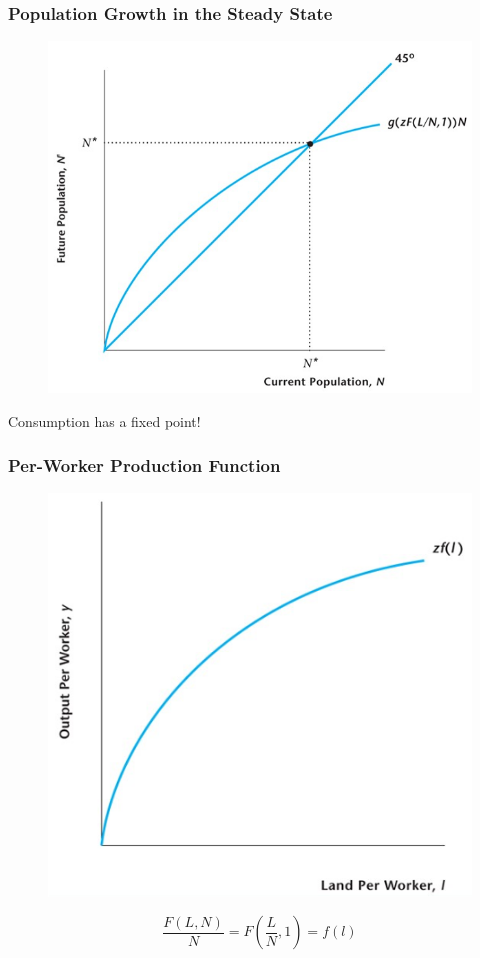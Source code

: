 \documentclass{beamer}
\begin{document}
\begin{frame}
\frametitle[alignment=center]{Population Growth in the Steady State}
\begin{figure}
\centering
\includegraphics[scale=0.5]{Figures/W_Fig_7pt6.png}
\end{figure}
Consumption has a fixed point!
\end{frame}

\begin{frame}
\frametitle[alignment=center]{Per-Worker Production Function}
\begin{figure}
\centering
\includegraphics[scale=0.5]{Figures/W_Fig_7pt7.png}
\end{figure}
$$\frac{F(L,N)}{N}=F\left(\frac{L}{N},1\right)=f(l)$$
\end{frame}
\end{document}
